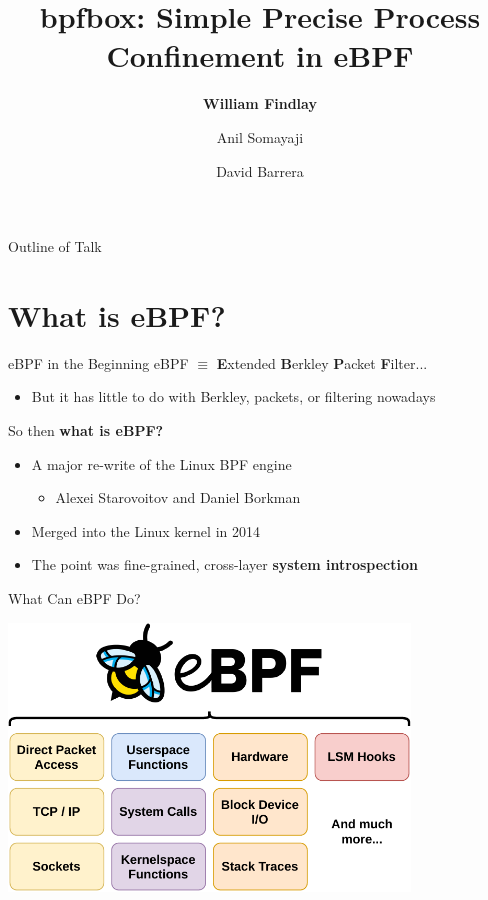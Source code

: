 \documentclass[12pt, dvipsnames]{beamer}
\title{bpfbox: Simple Precise Process Confinement in eBPF}
\author{\textbf{William Findlay} \and Anil Somayaji \and David Barrera}
\institute{Carleton University\\\url{will@ccsl.carleton.ca}}
\begin{document}

\begin{frame}
\titlepage
\end{frame}

\setwatermark[hoffset=6cm, voffset=0.3cm]{}


\begin{frame}{Outline of Talk}
    \tableofcontents
\end{frame}

\section{What is eBPF?}

\begin{frame}[c]{eBPF in the Beginning}
eBPF $\equiv$ \textbf{E}xtended \textbf{B}erkley \textbf{P}acket \textbf{F}ilter...
\begin{itemize}
    \item But it has little to do with Berkley, packets, or filtering nowadays
\end{itemize}
\vfill
So then \textbf{what is eBPF?}
\begin{itemize}
    \item A major re-write of the Linux BPF engine
    \begin{itemize}
        \item Alexei Starovoitov and Daniel Borkman
    \end{itemize}
    \item Merged into the Linux kernel in 2014
    \item The point was fine-grained, cross-layer \textbf{system introspection}
\end{itemize}
\end{frame}

\begin{frame}[c]{What Can eBPF Do?}
\begin{center}
    \color{black}
    \includegraphics[width=0.8\textwidth]{figs/ebpf-overview.pdf}
\end{center}
\end{frame}
\end{document}
